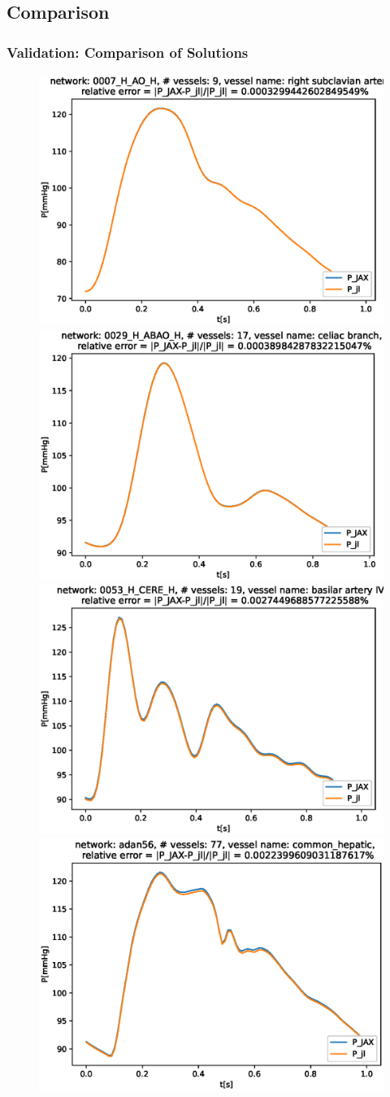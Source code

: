 \documentclass[compress]{beamer}
\begin{document}
\subsection{Comparison}
\begin{frame}
	\frametitle{Validation: Comparison of Solutions}
	\begin{figure} [H]
		\centering
		\includegraphics[width=0.46\columnwidth]{../figures/0007_H_AO_H_right_subclavian_artery_P.eps}
		\includegraphics[width=0.46\columnwidth]{../figures/0029_H_ABAO_H_celiac_branch_P.eps
		}
		\includegraphics[width=0.46\columnwidth]{../figures/0053_H_CERE_H_basilar_artery_IV_P.eps}
		\includegraphics[width=0.46\columnwidth]{../figures/adan56_common_hepatic_P.eps}
		\label{fig:val}
	\end{figure}
\end{frame}
\end{document}
